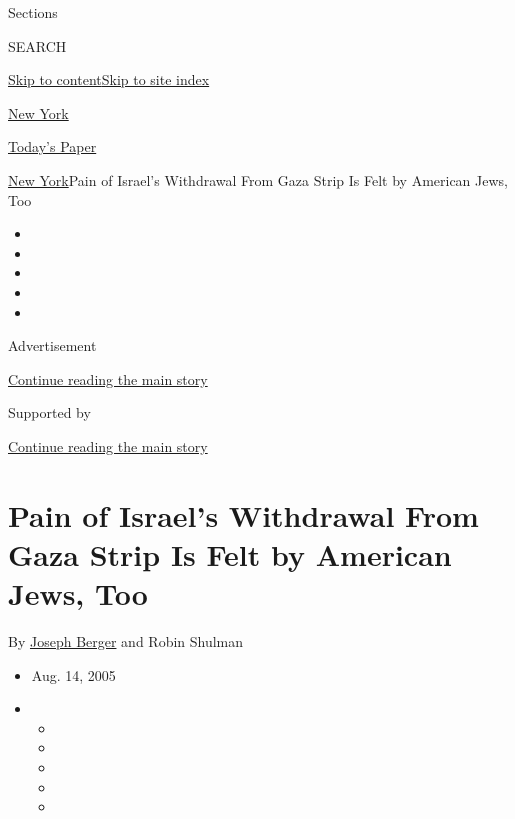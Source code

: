Sections

SEARCH

\protect\hyperlink{site-content}{Skip to
content}\protect\hyperlink{site-index}{Skip to site index}

\href{https://www.nytimes3xbfgragh.onion/section/nyregion}{New York}

\href{https://myaccount.nytimes3xbfgragh.onion/auth/login?response_type=cookie\&client_id=vi}{}

\href{https://www.nytimes3xbfgragh.onion/section/todayspaper}{Today's
Paper}

\href{/section/nyregion}{New York}\textbar{}Pain of Israel's Withdrawal
From Gaza Strip Is Felt by American Jews, Too

\begin{itemize}
\item
\item
\item
\item
\item
\end{itemize}

Advertisement

\protect\hyperlink{after-top}{Continue reading the main story}

Supported by

\protect\hyperlink{after-sponsor}{Continue reading the main story}

\hypertarget{pain-of-israels-withdrawal-from-gaza-strip-is-felt-by-american-jews-too}{%
\section{Pain of Israel's Withdrawal From Gaza Strip Is Felt by American
Jews,
Too}\label{pain-of-israels-withdrawal-from-gaza-strip-is-felt-by-american-jews-too}}

By \href{https://www.nytimes3xbfgragh.onion/by/joseph-berger}{Joseph
Berger} and Robin Shulman

\begin{itemize}
\item
  Aug. 14, 2005
\item
  \begin{itemize}
  \item
  \item
  \item
  \item
  \item
  \end{itemize}
\end{itemize}

